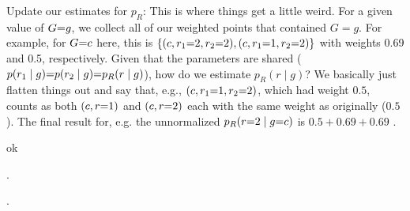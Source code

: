 \documentclass[11pt]{article}
\newcommand\p{\Needspace{10\baselineskip} \noindent}
\begin{document}
\begin{example}
\begin{compactenum}
		\item Update our estimates for $p_R$: This is where things get a little weird. For a given value of $G {=} g$, we collect all of our weighted points that contained $G=g$. For example, for $G {=} c$ here, this is $\{ (c, r_1 {=} 2, r_2 {=} 2), (c, r_1 {=} 1, r_2 {=} 2) \}$ with weights 0.69 and 0.5, respectively. Given that the parameters are shared ($p(r_1 \mid g) {=} p(r_2 \mid g) {=} p_R(r \mid g)$), how do we estimate $p_R(r \mid g)$? We basically just flatten things out and say that, e.g., $(c, r_1{=}1, r_2{=}2)$, which had weight $0.5$, counts as both $(c, r{=}1)$ and $(c, r{=}2)$ each with the same weight as originally  ($0.5$). The final result for, e.g. the unnormalized $p_R(r {=} 2\mid g {=} c)$ is $0.5 + 0.69 + 0.69$ . 
	\end{compactenum}
\end{example}




ok


























\label{Review}


\p {}. 

\p {}. 
\end{document}
